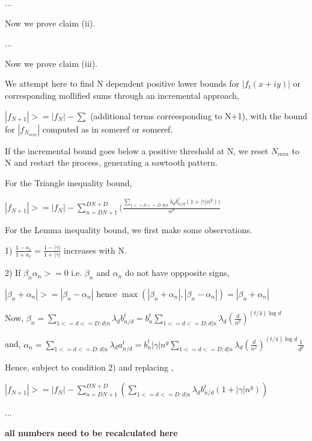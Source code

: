...


Now we prove claim (ii).

...

Now we prove claim (iii).

We attempt here to find N dependent positive lower bounds for $|f_{t}(x+iy)|$ or corresponding mollified sums through an incremental approach,

$ |f_{N+1}| >= |f_{N}| - \sum$ (additional terms correesponding to N+1), 
with the bound for $|f_{N_{min}}|$ computed as in someref or someref.

If the incremental bound goes below a positive threshold at N, we reset $N_{min}$ to N and restart the process, generating a sawtooth pattern.

For the Triangle inequality bound,

$|f_{N+1}| >= |f_{N}| - \sum\limits_{n=DN+1}^{DN+D} (\frac{\sum\limits_{1<=d<=D:d|n} \lambda_{d} b_{n/d}^{t} (1 + |\gamma|n^y))}{n^\sigma}$

For the Lemma inequality bound, we first make some observations.

1) $\frac{1-a_1}{1+a_1} = \frac{1-|\gamma|}{1+|\gamma|}$ increases with N.

2) If $\beta_{n} \alpha_{n} >= 0$ i.e. $\beta_{n}$ and $\alpha_{n}$ do not have oppposite signs,

$|\beta_{n} + \alpha_{n}| >= |\beta_{n} - \alpha_{n}|$
hence $\max (|\beta_{n} + \alpha_{n}|, |\beta_{n} - \alpha_{n}|) = |\beta_{n} + \alpha_{n}|$

Now, $\beta_{n} = \sum\limits_{1<=d<=D:d|n} \lambda_{d} b_{n/d}^{t} = b_{n}^{t} \sum\limits_{1<=d<=D:d|n} \lambda_{d} ({\frac{d}{n^2}})^{(t/4) \log d}$

and, $\alpha_{n} = \sum\limits_{1<=d<=D:d|n} \lambda_{d} a_{n/d}^{t} = b_{n}^{t}|\gamma|n^y \sum\limits_{1<=d<=D:d|n} \lambda_{d} ({\frac{d}{n^2}})^{(t/4) \log d} \frac{1}{d^y}$

Hence, subject to condition 2) and replacing ,


$|f_{N+1}| >= |f_{N}| - \sum\limits_{n=DN+1}^{DN+D} (\sum\limits_{1<=d<=D:d|n} \lambda_{d} b_{n/d}^{t} (1 + |\gamma|n^y))$


...

{\bf all numbers need to be recalculated here}

